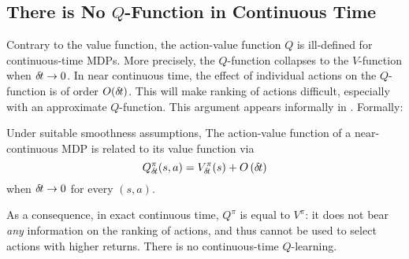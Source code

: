 \subsection{There is No $Q$-Function in Continuous Time}

Contrary to the value function, the action-value function $Q$ is ill-defined
for continuous-time MDPs. More precisely, the $Q$-function  collapses to the
$V$-function when ${\delta\hspace{-.1em}t} \rightarrow 0$. In near continuous time, the effect of
individual actions on the $Q$-function is of order $O({\delta\hspace{-.1em}t})$. This
will make 
ranking of actions difficult, especially with an approximate
$Q$-function.
This argument appears informally in \cite{adv_upd}.
Formally:
\begin{theorem}
  \label{th:q-cont}
  Under suitable smoothness assumptions,
The action-value function of a near-continuous MDP is related to its
value function via
\begin{equation}
	\label{eq:q-discr}
	Q^\pi_{\delta\hspace{-.1em}t}(s, a) = V^\pi_{\delta\hspace{-.1em}t}(s) + O\left({\delta\hspace{-.1em}t}\right)
\end{equation}
when ${\delta\hspace{-.1em}t} \to 0$ for every $(s,a)$.
\end{theorem}

As a consequence, in exact continuous time,
$Q^\pi$ is equal to $V^\pi$:  it does not bear \emph{any} information on the ranking of actions, and
thus cannot be used to select actions with higher returns.
There is no continuous-time $Q$-learning.

